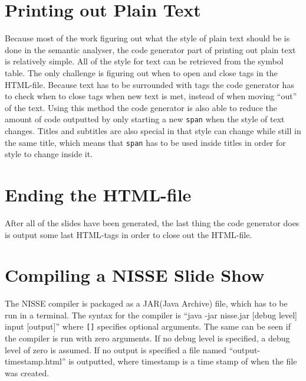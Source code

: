 \section{Printing out Plain Text}
Because most of the work figuring out what the style of plain text should be is done in the semantic analyser, the code generator part of printing out plain text is relatively simple. All of the style for text can be retrieved from the symbol table. The only challenge is figuring out when to open and close tags in the HTML-file. Because text has to be surrounded with tags the code generator has to check when to close tags when new text is met, instead of when moving ``out'' of the text. Using this method the code generator is also able to reduce the amount of code outputted by only starting a new \texttt{span} when the style of text changes. Titles and subtitles are also special in that style can change while still in the same title, which means that \texttt{span} has to be used inside titles in order for style to change inside it.

\section{Ending the HTML-file}
After all of the slides have been generated, the last thing the code generator does is output some last HTML-tags in order to close out the HTML-file.

\section{Compiling a NISSE Slide Show}
The NISSE compiler is packaged as a JAR(Java Archive) file, which has to be run in a terminal. The syntax for the compiler is ``java -jar nisse.jar [debug level] input [output]'' where \texttt{[]} specifies optional arguments. The same can be seen if the compiler is run with zero arguments. If no debug level is specified, a debug level of zero is assumed. If no output is specified a file named ``output-timestamp.html'' is outputted, where timestamp is a time stamp of when the file was created.
